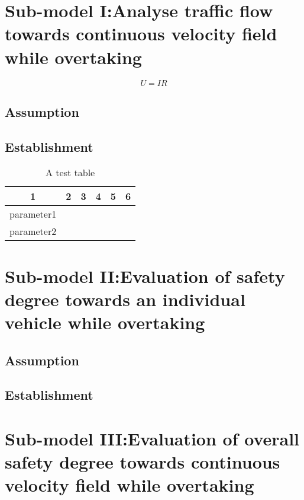 
\section{Sub-model I:Analyse traffic flow towards continuous velocity field
while overtaking}

\begin{equation}
U=IR
\end{equation}


\subsection{Assumption}

\subsection{Establishment}

\begin{table}[h]
\caption{A test table}

\centering{}%
\begin{tabular}{cccccc}
\toprule 
1 & 2 & 3 & 4 & 5 & 6\tabularnewline
\midrule
parameter1 &  &  &  &  & \tabularnewline
parameter2 &  &  &  &  & \tabularnewline
\bottomrule
\end{tabular}
\end{table}


\section{Sub-model II:Evaluation of safety degree towards an individual vehicle
while overtaking}

\subsection{Assumption}

\subsection{Establishment}

\section{Sub-model III:Evaluation of overall safety degree towards continuous
velocity field while overtaking}
